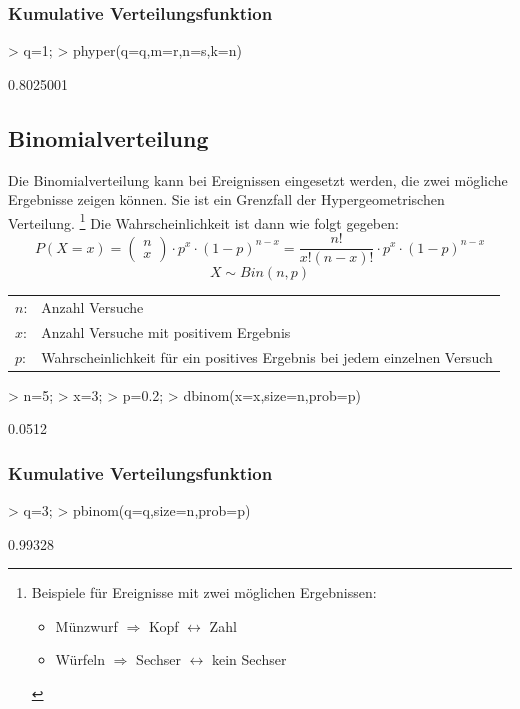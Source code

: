 \subsubsection{Kumulative Verteilungsfunktion}
\begin{Schunk}
\begin{Sinput}
> q=1;
> phyper(q=q,m=r,n=s,k=n)
\end{Sinput}
\begin{Soutput}
[1] 0.8025001
\end{Soutput}
\end{Schunk}

\subsection{Binomialverteilung}
Die Binomialverteilung kann bei Ereignissen eingesetzt werden, die zwei 
mögliche Ergebnisse zeigen können. Sie ist ein Grenzfall der 
Hypergeometrischen Verteilung. 
\footnote{Beispiele für Ereignisse mit zwei möglichen Ergebnissen: 
  \begin{itemize} 
    \item Münzwurf $\Rightarrow$ Kopf $\leftrightarrow$ Zahl
    \item Würfeln $\Rightarrow$ Sechser $\leftrightarrow$ kein Sechser
  \end{itemize}}
Die Wahrscheinlichkeit ist dann wie folgt gegeben: 
\[ P(X=x) = 
\left( \begin{array}{c}n\\x\end{array} \right) \cdot p^x \cdot (1-p)^{n-x} 
= \frac{n!}{x! (n-x)!} \cdot p^x \cdot (1-p)^{n-x} \]
\[ X \sim Bin(n,p) \]
\begin{tabular}{@{}ll}
  $n$: & Anzahl Versuche \\
  $x$: & Anzahl Versuche mit positivem Ergebnis \\
  $p$: & Wahrscheinlichkeit für ein positives Ergebnis bei jedem einzelnen Versuch
\end{tabular} 
\begin{Schunk}
\begin{Sinput}
> n=5;
> x=3;
> p=0.2;
> dbinom(x=x,size=n,prob=p)
\end{Sinput}
\begin{Soutput}
[1] 0.0512
\end{Soutput}
\end{Schunk}
\subsubsection{Kumulative Verteilungsfunktion}
\begin{Schunk}
\begin{Sinput}
> q=3;
> pbinom(q=q,size=n,prob=p)
\end{Sinput}
\begin{Soutput}
[1] 0.99328
\end{Soutput}
\end{Schunk}

